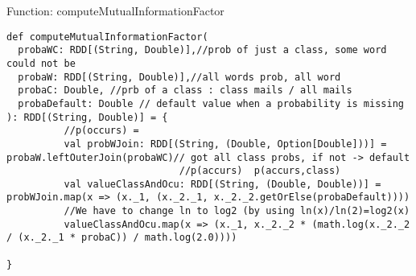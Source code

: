 \documentclass[paper=a4, fontsize=11pt]{scrartcl}
\numberwithin{equation}{section}		%
\numberwithin{figure}{section}			%
\numberwithin{table}{section}				%
\begin{document}
Function: computeMutualInformationFactor
\begin{lstlisting}
def computeMutualInformationFactor(
  probaWC: RDD[(String, Double)],//prob of just a class, some word could not be 
  probaW: RDD[(String, Double)],//all words prob, all word
  probaC: Double, //prb of a class : class mails / all mails
  probaDefault: Double // default value when a probability is missing
): RDD[(String, Double)] = {
          //p(occurs) = 
          val probWJoin: RDD[(String, (Double, Option[Double]))] = probaW.leftOuterJoin(probaWC)// got all class probs, if not -> default
                              //p(accurs)  p(accurs,class) 
          val valueClassAndOcu: RDD[(String, (Double, Double))] = probWJoin.map(x => (x._1, (x._2._1, x._2._2.getOrElse(probaDefault))))
          //We have to change ln to log2 (by using ln(x)/ln(2)=log2(x)
          valueClassAndOcu.map(x => (x._1, x._2._2 * (math.log(x._2._2 / (x._2._1 * probaC)) / math.log(2.0))))

}
\end{lstlisting}
\end{document}
